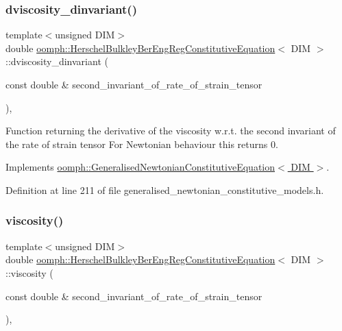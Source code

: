\subsubsection{\texorpdfstring{dviscosity\+\_\+dinvariant()}{dviscosity\_dinvariant()}}
{\footnotesize\ttfamily template$<$unsigned D\+IM$>$ \\
double \hyperlink{classoomph_1_1HerschelBulkleyBerEngRegConstitutiveEquation}{oomph\+::\+Herschel\+Bulkley\+Ber\+Eng\+Reg\+Constitutive\+Equation}$<$ D\+IM $>$\+::dviscosity\+\_\+dinvariant (\begin{DoxyParamCaption}\item[{const double \&}]{second\+\_\+invariant\+\_\+of\+\_\+rate\+\_\+of\+\_\+strain\+\_\+tensor }\end{DoxyParamCaption})\hspace{0.3cm}{\ttfamily [inline]}, {\ttfamily [virtual]}}

Function returning the derivative of the viscosity w.\+r.\+t. the second invariant of the rate of strain tensor For Newtonian behaviour this returns 0. 

Implements \hyperlink{classoomph_1_1GeneralisedNewtonianConstitutiveEquation_ad0164e6ca57cc986048346e12c4d353a}{oomph\+::\+Generalised\+Newtonian\+Constitutive\+Equation$<$ D\+I\+M $>$}.



Definition at line 211 of file generalised\+\_\+newtonian\+\_\+constitutive\+\_\+models.\+h.

\mbox{\label{classoomph_1_1HerschelBulkleyBerEngRegConstitutiveEquation_aa56ae7a2ef80789048d81925d9c9e9db}} 
\subsubsection{\texorpdfstring{viscosity()}{viscosity()}}
{\footnotesize\ttfamily template$<$unsigned D\+IM$>$ \\
double \hyperlink{classoomph_1_1HerschelBulkleyBerEngRegConstitutiveEquation}{oomph\+::\+Herschel\+Bulkley\+Ber\+Eng\+Reg\+Constitutive\+Equation}$<$ D\+IM $>$\+::viscosity (\begin{DoxyParamCaption}\item[{const double \&}]{second\+\_\+invariant\+\_\+of\+\_\+rate\+\_\+of\+\_\+strain\+\_\+tensor }\end{DoxyParamCaption})\hspace{0.3cm}{\ttfamily [inline]}, {\ttfamily [virtual]}}

